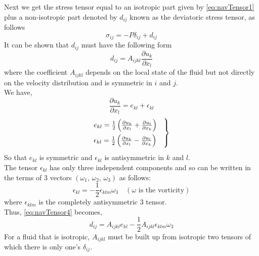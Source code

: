 \documentclass[../main-sheet.tex]{subfiles}
\begin{document}
\begin{soln}
    Next we get the stress tensor equal to an isotropic part given by \eqref{eq:navTensor1} plus a non-isotropic part denoted by \(d_{ij}\) known as the deviatoric stress tensor, as follows
    \begin{equation}
        \sigma_{ij}=-P\delta_{ij}+d_{ij} \label{eq:navTensor3}
    \end{equation}
    It can be shown that \(d_{ij}\) must have the following form
    \begin{equation}
        d_{ij}=A_{ijkl}\frac{\partial u_k}{\partial x_l}\label{eq:navTensor4}
    \end{equation}
    where the coefficient \(A_{ijkl}\) depends on the local state of the fluid but not directly on the velocity distribution and is symmetric in \(i\) and \(j\).\\
    We have,
    \[\frac{\partial u_k}{\partial x_l}=e_{kl}+\epsilon_{kl}\]
    \begin{equation}
        \begin{rcases}
            e_{kl}=\frac{1}{2}\left( \frac{\partial u_k}{\partial x_l}+\frac{\partial u_l}{\partial x_k} \right)\\
            \epsilon_{kl}=\frac{1}{2}\left( \frac{\partial u_k}{\partial x_l}-\frac{\partial u_l}{\partial x_k} \right)\quad
        \end{rcases}\label{eq:navTensor5}
    \end{equation}
    So that \(e_{kl}\) is symmetric and \(\epsilon_{kl}\) is antisymmetric in \(k\) and \(l\).\\
    The tensor \(\epsilon_{kl}\) has only three independent components and so can be written in the terms of 3 vectors \((\omega_1,\,\omega_2,\,\omega_3)\) as follows:
    \begin{equation}
        \epsilon_{kl}=-\frac{1}{2}\epsilon_{klm}\omega_3\quad(\omega\text{ is the vorticity})\label{eq:navTensor6}
    \end{equation}
    where \(\epsilon_{klm}\) is the completely antisymmetric 3 tensor.\\
    Thus, \eqref{eq:navTensor4} becomes,
    \begin{equation}
        d_{ij}=A_{ijkl}e_{kl}-\frac{1}{2}A_{ijkl}\epsilon_{klm}\omega_3\label{eq:navTensor7}
    \end{equation}
    For a fluid that is isotropic, \(A_{ijkl}\) must be built up from isotropic two tensors of which there is only one's \(\delta_{ij}\).


\end{soln}
\end{document}

